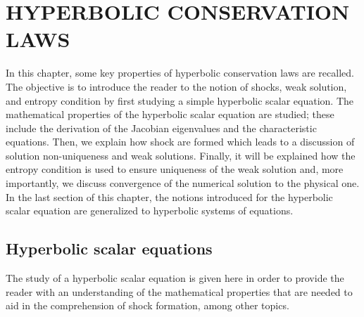 %
%
%

%
\chapter{\uppercase {Hyperbolic conservation laws}}\label{chap:theory_chp1}
%
In this chapter, some key properties of hyperbolic conservation laws are recalled. The objective is to introduce the reader to the notion of shocks, weak solution, and entropy condition by first studying a simple hyperbolic scalar equation. The mathematical properties of the hyperbolic scalar equation are studied; these include the derivation of the Jacobian eigenvalues and the characteristic equations. Then, we explain how shock are formed which leads to a discussion of solution non-uniqueness and weak solutions. Finally, it will be explained how the entropy condition is used to ensure uniqueness of the weak solution and, more importantly, we discuss convergence of the numerical solution to the physical one. In the last section of this chapter, the notions introduced for the hyperbolic scalar equation are generalized to hyperbolic systems of equations.

\section{Hyperbolic scalar equations}\label{sec:hyp_scalar_sct1b}

The study of a hyperbolic scalar equation is given here in order to provide the reader with an understanding of the  mathematical properties that are needed to aid in the comprehension of shock formation, among other topics.

